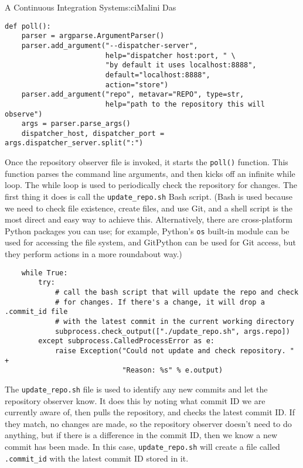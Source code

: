 \begin{aosachapter}{A Continuous Integration System}{s:ci}{Malini Das}
\begin{verbatim}
def poll():
    parser = argparse.ArgumentParser()
    parser.add_argument("--dispatcher-server",
                        help="dispatcher host:port, " \
                        "by default it uses localhost:8888",
                        default="localhost:8888",
                        action="store")
    parser.add_argument("repo", metavar="REPO", type=str,
                        help="path to the repository this will observe")
    args = parser.parse_args()
    dispatcher_host, dispatcher_port = args.dispatcher_server.split(":")
\end{verbatim}

Once the repository observer file is invoked, it starts the
\texttt{poll()} function. This function parses the command line
arguments, and then kicks off an infinite while loop. The while loop is
used to periodically check the repository for changes. The first thing
it does is call the \texttt{update\_repo.sh} Bash script. (Bash is used
because we need to check file existence, create files, and use Git, and
a shell script is the most direct and easy way to achieve this.
Alternatively, there are cross-platform Python packages you can use; for
example, Python's \texttt{os} built-in module can be used for accessing
the file system, and GitPython can be used for Git access, but they
perform actions in a more roundabout way.)

\begin{verbatim}
    while True:
        try:
            # call the bash script that will update the repo and check
            # for changes. If there's a change, it will drop a .commit_id file
            # with the latest commit in the current working directory
            subprocess.check_output(["./update_repo.sh", args.repo])
        except subprocess.CalledProcessError as e:
            raise Exception("Could not update and check repository. " +
                            "Reason: %s" % e.output)
\end{verbatim}

The \texttt{update\_repo.sh} file is used to identify any new commits
and let the repository observer know. It does this by noting what commit
ID we are currently aware of, then pulls the repository, and checks the
latest commit ID. If they match, no changes are made, so the repository
observer doesn't need to do anything, but if there is a difference in
the commit ID, then we know a new commit has been made. In this case,
\texttt{update\_repo.sh} will create a file called \texttt{.commit\_id}
with the latest commit ID stored in it.


\end{aosachapter}
